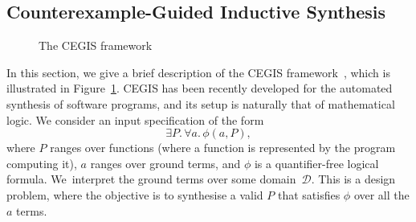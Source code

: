 \documentclass[twocolumn]{autart}    %
\begin{document}
\subsection{Counterexample-Guided Inductive Synthesis} 
\label{ssec:cegis}

\begin{figure}
\centering
{}
 \caption{The CEGIS framework\label{fig:CEGIS}}
\end{figure}

In this section, we give a brief description of the CEGIS framework~\cite{jha-icse10,
  DBLP:conf/asplos/Solar-LezamaTBSS06}, which is illustrated in Figure~\ref{fig:CEGIS}. 
  CEGIS has been recently developed for the automated synthesis of software programs, 
  and its setup is naturally that of mathematical logic. We consider an input specification of the form 
$$
\exists P .\, \forall a.\, \phi(a, P),
$$  
where $P$ ranges over functions (where a function is represented by the program computing it),
$a$ ranges over ground terms, 
and $\phi$ is a quantifier-free logical formula. 
We~interpret the ground terms over some domain~$\mathcal{D}$. 
This is a design problem, where the objective is to synthesise a valid $P$ that satisfies $\phi$ over all the $a$ terms. 
\end{document}
